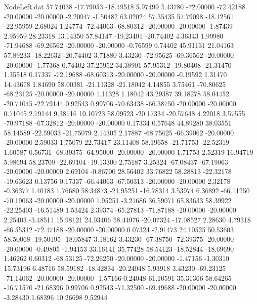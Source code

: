 \begin{filecontents}{NodeLeft.dat}
  57.74038  -17.79053  -18.49518     5.97499    5.43780  -72.00000  -72.42188  -20.00000  -20.00000   -2.20947   -1.50482   63.02024   57.35435
  57.79098  -18.12561  -22.95959     2.68024    1.24774  -72.44063  -68.80312  -20.00000  -20.00000   -1.87439    2.95959   28.23318   13.14350
  57.84147  -19.23401  -20.74402     4.36343    1.99980  -71.94688  -69.26562  -20.00000  -20.00000   -0.76599    0.74402   45.91131   21.04163
  57.89233  -18.22632  -20.74402     3.71880    3.43230  -72.95625  -69.36562  -20.00000  -20.00000   -1.77368    0.74402   37.25952   34.38901
  57.95312  -19.80408  -21.31470     1.35518    0.17337  -72.19688  -68.60313  -20.00000  -20.00000   -0.19592    1.31470   14.43678    1.84690
  58.00381  -21.11328  -21.18042     4.14855    3.75461  -70.80625  -68.23125  -20.00000  -20.00000    1.11328    1.18042   43.29387   39.18278
  58.04452  -20.71045  -22.79144     0.92543    0.99706  -70.63438  -66.38750  -20.00000  -20.00000    0.71045    2.79144    9.38116   10.10723
  58.09523  -20.17334  -20.57648     4.22018    3.57555  -70.97188  -67.32812  -20.00000  -20.00000    0.17334    0.57648   44.89280   38.03551
  58.14589  -22.59033  -21.75079     2.14305    2.17887  -68.75625  -66.39062  -20.00000  -20.00000    2.59033    1.75079   22.73417   23.11408
  58.19658  -21.71753  -22.52319     1.60587    0.56731  -68.39375  -64.95000  -20.00000  -20.00000    1.71753    2.52319   16.94719    5.98694
  58.23709  -22.69104  -19.13300     2.75187    3.25324  -67.08437  -67.19063  -20.00000  -20.00000    2.69104   -0.86700   28.56402   33.76822
  58.28813  -22.32178  -19.63623     0.13756    0.17337  -66.44063  -67.50313  -20.00000  -20.00000    2.32178   -0.36377    1.40183    1.76680
  58.34873  -21.95251  -16.78314     3.53974    6.36892  -66.11250  -70.19063  -20.00000  -20.00000    1.95251   -3.21686   36.59071   65.83633
  58.39922  -22.25403  -16.51489     1.53424    2.39374  -65.27813  -71.87188  -20.00000  -20.00000    2.25403   -3.48511   15.98121   24.93406
  58.44976  -20.07324  -17.08527     2.28630    4.79318  -66.55312  -72.47188  -20.00000  -20.00000    0.07324   -2.91473   24.10525   50.53603
  58.50068  -19.50195  -18.05847     3.18162    3.43230  -67.38750  -72.39375  -20.00000  -20.00000   -0.49805   -1.94153   33.16141   35.77428
  58.54123  -18.52844  -18.69690     1.46262    0.60312  -68.53125  -72.26250  -20.00000  -20.00000   -1.47156   -1.30310   15.73196    6.48716
  58.59182  -18.42834  -20.24048     5.93918    3.43230  -69.23125  -71.14062  -20.00000  -20.00000   -1.57166    0.24048   61.10591   35.31366
  58.64265  -16.71570  -21.68396     0.99706    0.92543  -71.32500  -69.49688  -20.00000  -20.00000   -3.28430    1.68396   10.26698    9.52944

\end{filecontents}

